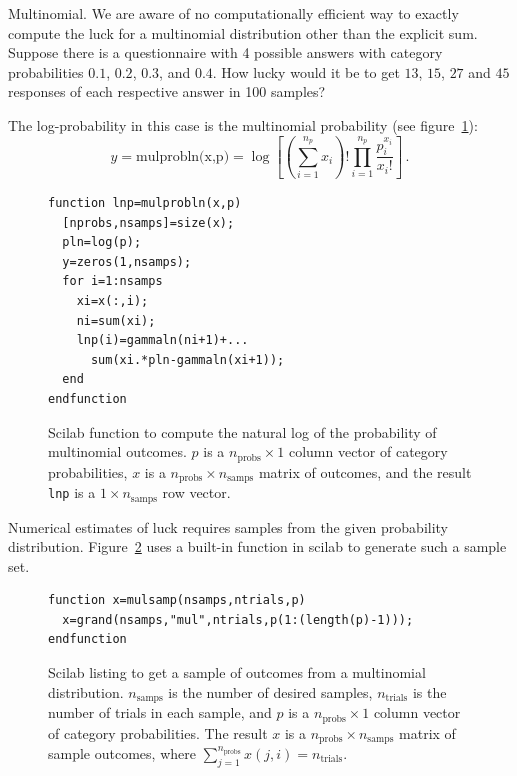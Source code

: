 \begin{example}{Multinomial.} We are aware of no computationally efficient way to exactly compute the luck for a multinomial distribution other than the explicit sum.  Suppose there is a questionnaire with 4 possible answers with category probabilities $0.1$, $0.2$, $0.3$, and $0.4$.  How lucky would it be to get $13$, $15$, $27$ and $45$ responses of each respective answer in 100 samples? 


The log-probability in this case is the multinomial probability (see figure~\ref{fig:mulprobln}):
\begin{equation}
y=\text{mulprobln(x,p)}=\log \left[\left(\sum_{i=1}^{n_p} x_i \right)! \prod_{i=1}^{n_p} \frac{p_i^{x_i}}{x_i!} \right]\,.
\end{equation}

\begin{figure}
\caption{\label{fig:mulprobln}Scilab function to compute the natural log of the probability of multinomial outcomes.  $p$ is a $n_{\text{probs}} \times 1$ column vector of category probabilities, $x$ is a $n_{\text{probs}} \times n_{\text{samps}}$ matrix of outcomes, and the result {\tt lnp} is a $1 \times n_{\text{samps}}$ row vector.}
\lstset{language=Scilab}
\begin{lstlisting}
function lnp=mulprobln(x,p)
  [nprobs,nsamps]=size(x);
  pln=log(p);
  y=zeros(1,nsamps);
  for i=1:nsamps
    xi=x(:,i);
    ni=sum(xi);
    lnp(i)=gammaln(ni+1)+...
      sum(xi.*pln-gammaln(xi+1));
  end
endfunction
\end{lstlisting}
\end{figure}

Numerical estimates of luck requires samples from the given probability distribution.  Figure~\ref{fig:mulsamps} uses a built-in function in scilab to generate such a sample set.
\begin{figure}
\caption{\label{fig:mulsamps}Scilab listing to get a sample of outcomes from a multinomial distribution.  $n_{\text{samps}}$ is the number of desired samples, $n_{\text{trials}}$ is the number of trials in each sample, and $p$ is a $n_{\text{probs}} \times 1$ column vector of category probabilities.  The result $x$ is a $n_{\text{probs}} \times n_{\text{samps}}$ matrix of sample outcomes, where $\sum_{j=1}^{n_{\text{probs}}} x(j,i)=n_{\text{trials}}$.}
\lstset{language=Scilab}
\begin{lstlisting}
function x=mulsamp(nsamps,ntrials,p)
  x=grand(nsamps,"mul",ntrials,p(1:(length(p)-1)));
endfunction
\end{lstlisting}
\end{figure}


\end{example}
